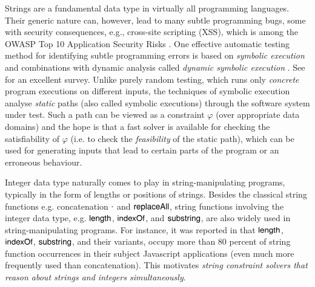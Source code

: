 
Strings are a fundamental data type in virtually all programming languages.
Their generic nature can, however, lead to many subtle programming
bugs, some with security consequences, e.g., cross-site scripting
(XSS), which is among the OWASP Top 10 Application Security Risks
\cite{owasp17}. One effective
automatic testing method for identifying subtle programming errors
is based on \emph{symbolic execution}
\cite{king76} and combinations with dynamic analysis
called \emph{dynamic symbolic execution} \cite{jalangi,DART,EXE,CUTE,KLEE}.
See \cite{symbex-survey} for an excellent survey. Unlike purely random testing,
which runs only \emph{concrete} program executions on different
inputs, the techniques of symbolic execution analyse \emph{static} paths
(also called symbolic executions) through the software system under test.
Such a path can be viewed as a constraint $\varphi$ (over
appropriate data domains) and the hope is that a fast
solver is available for checking the satisfiability of $\varphi$ (i.e. to check
the \emph{feasibility} of the static path), which can be used for generating
inputs that lead to certain parts of the program or an erroneous behaviour.

Integer data type naturally comes to play in string-manipulating programs, typically in the form of lengths or positions of strings. Besides the classical string functions e.g. concatenation $\cdot$ and $\mathsf{replaceAll}$, string functions involving the integer data type, e.g. $\mathsf{length}$, $\mathsf{indexOf}$, and $\mathsf{substring}$, are also widely used in string-manipulating programs. For instance, it was reported in \cite{Berkeley-JavaScript} that $\mathsf{length}$, $\mathsf{indexOf}$, $\mathsf{substring}$, and their variants, occupy more than 80 percent of string function occurrences in their subject Javascript applications (even much more frequently used than concatenation). This motivates \emph{string constraint solvers that reason about strings and integers simultaneously}. 




